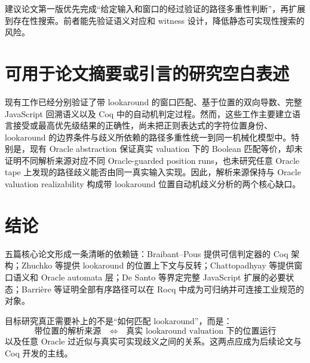\documentclass[UTF8,a4paper,12pt]{ctexart}
\begin{document}
建议论文第一版优先完成“给定输入和窗口的经过验证的路径多重性判断”，再扩展到存在性搜索。前者能先验证语义对应和 witness 设计，降低静态可实现性搜索的风险。

\section{可用于论文摘要或引言的研究空白表述}

现有工作已经分别验证了带 lookaround 的窗口匹配、基于位置的双向导数、完整 JavaScript 回溯语义以及 Coq 中的自动机判定过程。然而，这些工作主要建立语言接受或最高优先级结果的正确性，尚未把正则表达式的字符位置身份、lookaround 的边界条件与歧义所依赖的路径多重性统一到同一机械化模型中。特别是，现有 Oracle abstraction 保证真实 valuation 下的 Boolean 匹配等价，却未证明不同解析来源对应不同 Oracle-guarded position runs，也未研究任意 Oracle tape 上发现的路径歧义能否由同一真实输入实现。因此，解析来源保持与 Oracle valuation realizability 构成带 lookaround 位置自动机歧义分析的两个核心缺口。

\section{结论}

五篇核心论文形成一条清晰的依赖链：Braibant--Pous 提供可信判定器的 Coq 架构；Zhuchko 等提供 lookaround 的位置上下文与反转；Chattopadhyay 等提供窗口语义和 Oracle automata 层；De Santo 等界定完整 JavaScript 扩展的必要状态；Barri\`ere 等证明全部有序路径可以在 Rocq 中成为可归纳并可连接工业规范的对象。

目标研究真正需要补上的不是“如何匹配 lookaround”，而是：
\[
\boxed{
\text{带位置的解析来源}
\quad\Longleftrightarrow\quad
\text{真实 lookaround valuation 下的位置运行}
}
\]
以及任意 Oracle 过近似与真实可实现歧义之间的关系。这两点应成为后续论文与 Coq 开发的主线。
\end{document}
